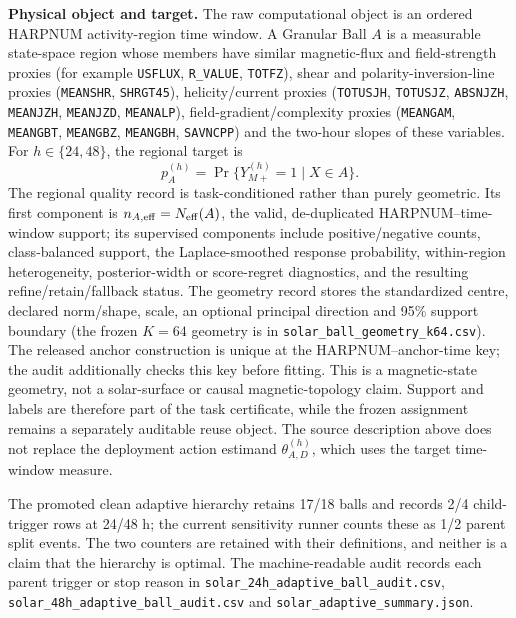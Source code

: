 \documentclass[11pt,a4paper]{article}
\numberwithin{equation}{section}
\theoremstyle{definition}\newtheorem{definition}[theorem]{Definition}
\theoremstyle{remark}\newtheorem{remark}[theorem]{Remark}
\begin{document}
\textbf{Physical object and target.} The raw computational object is an ordered HARPNUM activity-region time window. A Granular Ball $A$ is a measurable state-space region whose members have similar magnetic-flux and field-strength proxies (for example \texttt{USFLUX}, \texttt{R\_VALUE}, \texttt{TOTFZ}), shear and polarity-inversion-line proxies (\texttt{MEANSHR}, \texttt{SHRGT45}), helicity/current proxies (\texttt{TOTUSJH}, \texttt{TOTUSJZ}, \texttt{ABSNJZH}, \texttt{MEANJZH}, \texttt{MEANJZD}, \texttt{MEANALP}), field-gradient/complexity proxies (\texttt{MEANGAM}, \texttt{MEANGBT}, \texttt{MEANGBZ}, \texttt{MEANGBH}, \texttt{SAVNCPP}) and the two-hour slopes of these variables. For $h\in\{24,48\}$, the regional target is
\[
p_A^{(h)}=\Pr\{Y_{M+}^{(h)}=1\mid X\in A\}.
\]
The regional quality record is task-conditioned rather than purely geometric. Its first component is $n_{A,\mathrm{eff}}=N_{\rm eff}(A)$, the valid, de-duplicated HARPNUM--time-window support; its supervised components include positive/negative counts, class-balanced support, the Laplace-smoothed response probability, within-region heterogeneity, posterior-width or score-regret diagnostics, and the resulting refine/retain/fallback status. The geometry record stores the standardized centre, declared norm/shape, scale, an optional principal direction and 95\% support boundary (the frozen $K=64$ geometry is in \texttt{solar\_ball\_geometry\_k64.csv}). The released anchor construction is unique at the HARPNUM--anchor-time key; the audit additionally checks this key before fitting. This is a magnetic-state geometry, not a solar-surface or causal magnetic-topology claim. Support and labels are therefore part of the task certificate, while the frozen assignment remains a separately auditable reuse object. The source description above does not replace the deployment action estimand $\theta_{A,D}^{(h)}$, which uses the target time-window measure.

The promoted clean adaptive hierarchy retains 17/18 balls and records 2/4 child-trigger rows at 24/48 h; the current sensitivity runner counts these as 1/2 parent split events. The two counters are retained with their definitions, and neither is a claim that the hierarchy is optimal. The machine-readable audit records each parent trigger or stop reason in \texttt{solar\_24h\_adaptive\_ball\_audit.csv}, \texttt{solar\_48h\_adaptive\_ball\_audit.csv} and \texttt{solar\_adaptive\_summary.json}.
\end{document}
